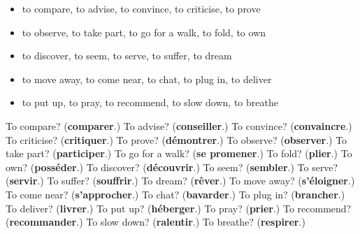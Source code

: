 \begin{itemize}
\raggedright
  \item to compare, to advise, to convince, to criticise, to prove
  \item to observe, to take part, to go for a walk, to fold, to own
  \item to discover, to seem, to serve, to suffer, to dream
  \item to move away, to come near, to chat, to plug in, to deliver
  \item to put up, to pray, to recommend, to slow down, to breathe
\end{itemize}

\begin{tcolorbox}[breakable,colback=teal!4,colframe=teal!35!black,title={Before you move on}]
To compare? (\textbf{comparer}.) To advise? (\textbf{conseiller}.) To convince? (\textbf{convaincre}.) To criticise? (\textbf{critiquer}.) To prove? (\textbf{démontrer}.) To observe? (\textbf{observer}.) To take part? (\textbf{participer}.) To go for a walk? (\textbf{se promener}.) To fold? (\textbf{plier}.) To own? (\textbf{posséder}.) To discover? (\textbf{découvrir}.) To seem? (\textbf{sembler}.) To serve? (\textbf{servir}.) To suffer? (\textbf{souffrir}.) To dream? (\textbf{rêver}.) To move away? (\textbf{s'éloigner}.) To come near? (\textbf{s'approcher}.) To chat? (\textbf{bavarder}.) To plug in? (\textbf{brancher}.) To deliver? (\textbf{livrer}.) To put up? (\textbf{héberger}.) To pray? (\textbf{prier}.) To recommend? (\textbf{recommander}.) To slow down? (\textbf{ralentir}.) To breathe? (\textbf{respirer}.)
\end{tcolorbox}
